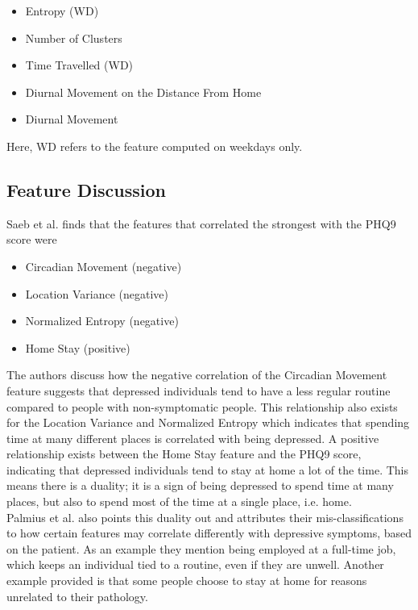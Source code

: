 \begin{itemize}
    \item Entropy (WD)
    \item Number of Clusters
    \item Time Travelled (WD)
    \item Diurnal Movement on the Distance From Home
    \item Diurnal Movement
\end{itemize}

Here, WD refers to the feature computed on weekdays only.\\

\subsection{Feature Discussion}
Saeb et al. finds that the features that correlated the strongest with the PHQ9 score were 
\begin{itemize}
    \item Circadian Movement (negative)
    \item Location Variance (negative)
    \item Normalized Entropy (negative)
    \item Home Stay (positive)
\end{itemize}

The authors discuss how the negative correlation of the Circadian Movement feature suggests that depressed individuals tend to have a less regular routine compared to people with non-symptomatic people. This relationship also exists for the Location Variance and Normalized Entropy which indicates that spending time at many different places is correlated with being depressed. A positive relationship exists between the Home Stay feature and the PHQ9 score, indicating that depressed individuals tend to stay at home a lot of the time. This means there is a duality; it is a sign of being depressed to spend time at many places, but also to spend most of the time at a single place, i.e. home.\\

Palmius et al. also points this duality out and attributes their mis-classifications to how certain features may correlate differently with depressive symptoms, based on the patient. As an example they mention being employed at a full-time job, which keeps an individual tied to a routine, even if they are unwell. Another example provided is that some people choose to stay at home for reasons unrelated to their pathology. 